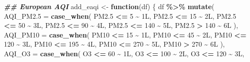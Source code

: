 \documentclass[
]{article}
\newenvironment{Shaded}{\begin{snugshade}}{\end{snugshade}}
\newcommand{\AttributeTok}[1]{\textcolor[rgb]{0.13,0.29,0.53}{#1}}
\newcommand{\ControlFlowTok}[1]{\textcolor[rgb]{0.13,0.29,0.53}{\textbf{#1}}}
\newcommand{\DataTypeTok}[1]{\textcolor[rgb]{0.13,0.29,0.53}{#1}}
\newcommand{\DecValTok}[1]{\textcolor[rgb]{0.00,0.00,0.81}{#1}}
\newcommand{\DocumentationTok}[1]{\textcolor[rgb]{0.56,0.35,0.01}{\textbf{\textit{#1}}}}
\newcommand{\FunctionTok}[1]{\textcolor[rgb]{0.13,0.29,0.53}{\textbf{#1}}}
\newcommand{\NormalTok}[1]{#1}
\newcommand{\OtherTok}[1]{\textcolor[rgb]{0.56,0.35,0.01}{#1}}
\newcommand{\SpecialCharTok}[1]{\textcolor[rgb]{0.81,0.36,0.00}{\textbf{#1}}}
\newcommand{\StringTok}[1]{\textcolor[rgb]{0.31,0.60,0.02}{#1}}
\begin{document}
\begin{Shaded}
\begin{Highlighting}[]
\DocumentationTok{\#\# European AQI}
\NormalTok{add\_eaqi }\OtherTok{\textless{}{-}} \ControlFlowTok{function}\NormalTok{(df) \{}
\NormalTok{  df }\SpecialCharTok{\%\textgreater{}\%}
    \FunctionTok{mutate}\NormalTok{(}
      \AttributeTok{AQI\_PM2.5 =} \FunctionTok{case\_when}\NormalTok{(}
        \StringTok{\textasciigrave{}}\AttributeTok{PM2.5}\StringTok{\textasciigrave{}} \SpecialCharTok{\textless{}=}   \DecValTok{5} \SpecialCharTok{\textasciitilde{}} \DecValTok{1}\DataTypeTok{L}\NormalTok{, }\StringTok{\textasciigrave{}}\AttributeTok{PM2.5}\StringTok{\textasciigrave{}} \SpecialCharTok{\textless{}=}  \DecValTok{15} \SpecialCharTok{\textasciitilde{}} \DecValTok{2}\DataTypeTok{L}\NormalTok{, }\StringTok{\textasciigrave{}}\AttributeTok{PM2.5}\StringTok{\textasciigrave{}} \SpecialCharTok{\textless{}=}  \DecValTok{50} \SpecialCharTok{\textasciitilde{}} \DecValTok{3}\DataTypeTok{L}\NormalTok{,}
        \StringTok{\textasciigrave{}}\AttributeTok{PM2.5}\StringTok{\textasciigrave{}} \SpecialCharTok{\textless{}=}  \DecValTok{90} \SpecialCharTok{\textasciitilde{}} \DecValTok{4}\DataTypeTok{L}\NormalTok{, }\StringTok{\textasciigrave{}}\AttributeTok{PM2.5}\StringTok{\textasciigrave{}} \SpecialCharTok{\textless{}=} \DecValTok{140} \SpecialCharTok{\textasciitilde{}} \DecValTok{5}\DataTypeTok{L}\NormalTok{, }\StringTok{\textasciigrave{}}\AttributeTok{PM2.5}\StringTok{\textasciigrave{}} \SpecialCharTok{\textgreater{}}  \DecValTok{140} \SpecialCharTok{\textasciitilde{}} \DecValTok{6}\DataTypeTok{L}
\NormalTok{      ),}
      \AttributeTok{AQI\_PM10 =} \FunctionTok{case\_when}\NormalTok{(}
\NormalTok{        PM10 }\SpecialCharTok{\textless{}=}  \DecValTok{15} \SpecialCharTok{\textasciitilde{}} \DecValTok{1}\DataTypeTok{L}\NormalTok{, PM10 }\SpecialCharTok{\textless{}=}  \DecValTok{45} \SpecialCharTok{\textasciitilde{}} \DecValTok{2}\DataTypeTok{L}\NormalTok{, PM10 }\SpecialCharTok{\textless{}=} \DecValTok{120} \SpecialCharTok{\textasciitilde{}} \DecValTok{3}\DataTypeTok{L}\NormalTok{,}
\NormalTok{        PM10 }\SpecialCharTok{\textless{}=} \DecValTok{195} \SpecialCharTok{\textasciitilde{}} \DecValTok{4}\DataTypeTok{L}\NormalTok{, PM10 }\SpecialCharTok{\textless{}=} \DecValTok{270} \SpecialCharTok{\textasciitilde{}} \DecValTok{5}\DataTypeTok{L}\NormalTok{, PM10 }\SpecialCharTok{\textgreater{}}  \DecValTok{270} \SpecialCharTok{\textasciitilde{}} \DecValTok{6}\DataTypeTok{L}
\NormalTok{      ),}
      \AttributeTok{AQI\_O3 =} \FunctionTok{case\_when}\NormalTok{(}
\NormalTok{        O3 }\SpecialCharTok{\textless{}=}  \DecValTok{60} \SpecialCharTok{\textasciitilde{}} \DecValTok{1}\DataTypeTok{L}\NormalTok{, O3 }\SpecialCharTok{\textless{}=} \DecValTok{100} \SpecialCharTok{\textasciitilde{}} \DecValTok{2}\DataTypeTok{L}\NormalTok{, O3 }\SpecialCharTok{\textless{}=} \DecValTok{120} \SpecialCharTok{\textasciitilde{}} \DecValTok{3}\DataTypeTok{L}\NormalTok{,}

\end{Highlighting}
\end{Shaded}
\end{document}
